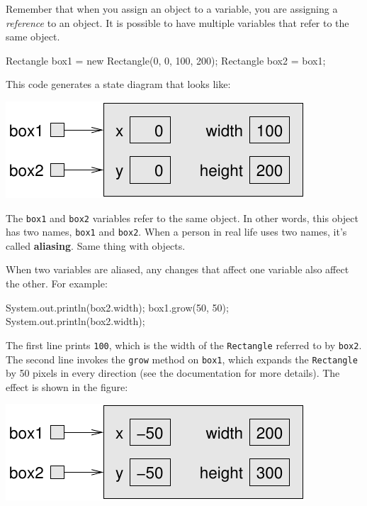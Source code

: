 \documentclass[12pt]{book}
\theoremstyle{exercise}
\newcommand{\java}[1]{\verb"#1"}
\newcommand{\java}[1]{\lstinline{#1}} %
\begin{document}

Remember that when you assign an object to a variable, you are assigning a {\em reference} to an object.
It is possible to have multiple variables that refer to the same object.

\begin{code}
    Rectangle box1 = new Rectangle(0, 0, 100, 200);
    Rectangle box2 = box1;
\end{code}

This code generates a state diagram that looks like:

\begin{center}
\includegraphics{figs/aliasing.pdf}
\end{center}


The \java{box1} and \java{box2} variables refer to the same object.
In other words, this object has two names, \java{box1} and \java{box2}.
When a person in real life uses two names, it's called {\bf aliasing}.
Same thing with objects.

When two variables are aliased, any changes that affect one variable also affect the other.
For example:

\begin{code}
    System.out.println(box2.width);
    box1.grow(50, 50);
    System.out.println(box2.width);
\end{code}

The first line prints {\tt 100}, which is the width of the \java{Rectangle} referred to by \java{box2}.
The second line invokes the \java{grow} method on \java{box1}, which expands the \java{Rectangle} by 50 pixels in every direction (see the documentation for more details).
The effect is shown in the figure:

\begin{center}
\includegraphics{figs/aliasing2.pdf}
\end{center}
\end{document}
